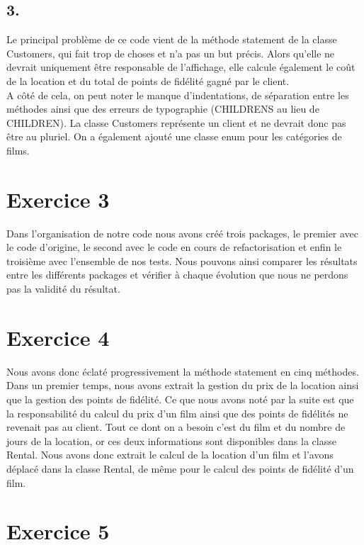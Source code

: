 \documentclass[%
a4paper,
11pt
]{article}
\begin{document}
\subsection*{3.}
Le principal problème de ce code vient de la méthode statement de la classe Customers, qui fait trop de choses et n'a pas un but précis. Alors qu'elle ne devrait uniquement être responsable de l'affichage, elle calcule également le coût de la location et du total de points de fidélité gagné par le client.\\ A côté de cela, on peut noter le manque d'indentations, de séparation entre les méthodes ainsi que des erreurs de typographie (CHILDRENS au lieu de CHILDREN). La classe Customers représente un client et ne devrait donc pas être au pluriel. On a également ajouté une classe enum pour les catégories de films.

\section*{Exercice 3}

Dans l'organisation de notre code nous avons créé trois packages, le premier avec le code d'origine, le second avec le code en cours de refactorisation et enfin le troisième avec l'ensemble de nos tests. Nous pouvons ainsi comparer les résultats entre les différents packages et vérifier à chaque évolution que nous ne perdons pas la validité du résultat.

\section*{Exercice 4}

Nous avons donc éclaté progressivement la méthode statement en cinq méthodes. Dans un premier temps, nous avons extrait la gestion du prix de la location ainsi que la gestion des points de fidélité. Ce que nous avons noté par la suite est que la responsabilité du calcul du prix d'un film ainsi que des points de fidélités ne revenait pas au client. Tout ce dont on a besoin c'est du film et du nombre de jours de la location, or ces deux informations sont disponibles dans la classe Rental. Nous avons donc extrait le calcul de la location d'un film et l'avons déplacé dans la classe Rental, de même pour le calcul des points de fidélité d'un film.


\section*{Exercice 5}
\end{document}
